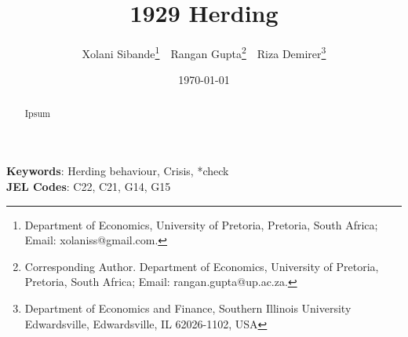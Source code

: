 
\title{1929 Herding}


\author { Xolani Sibande\footnote{Department of Economics, University of Pretoria, Pretoria, South Africa; Email: xolaniss@gmail.com.} \,\, 
Rangan Gupta\footnote{Corresponding Author. Department of Economics, University of Pretoria, Pretoria, South Africa; Email: rangan.gupta@up.ac.za.} \,\,
Riza Demirer\footnote{Department of Economics and Finance, Southern Illinois University Edwardsville, Edwardsville, IL 62026-1102, USA}}
\date{\today}
\maketitle

\begin{abstract}
Ipsum

\end{abstract}

\noindent\textbf{Keywords}: Herding behaviour, Crisis, *check
\\
\textbf{JEL Codes}: C22, C21, G14, G15
\newpage